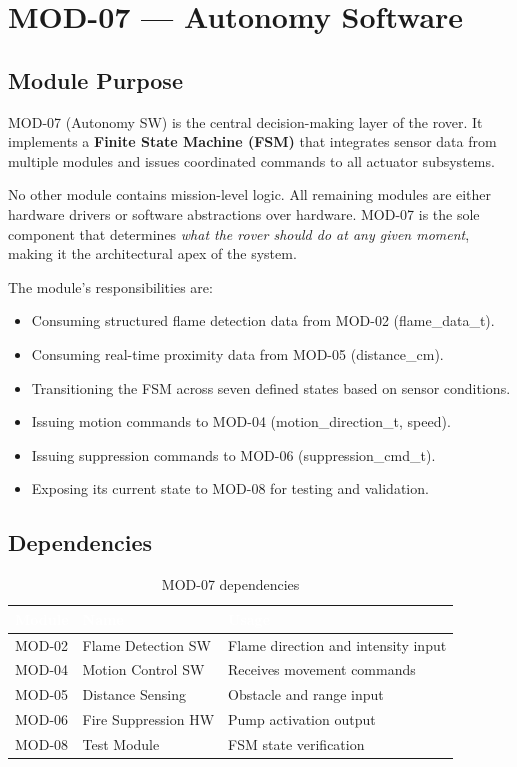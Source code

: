 \documentclass[12pt,a4paper]{article}
\newcommand{\theadtext}[1]{\textcolor{white}{\textbf{#1}}}
\newcommand{\fn}[1]{{\footnotesize\ttfamily #1}}
\begin{document}
\section{MOD-07 --- Autonomy Software}

\subsection{Module Purpose}

MOD-07 (Autonomy SW) is the central decision-making layer of the rover. It
implements a \textbf{Finite State Machine (FSM)} that integrates sensor data from
multiple modules and issues coordinated commands to all actuator subsystems.

No other module contains mission-level logic. All remaining modules are either
hardware drivers or software abstractions over hardware. MOD-07 is the sole
component that determines \emph{what the rover should do at any given moment},
making it the architectural apex of the system.

The module's responsibilities are:
\begin{itemize}[leftmargin=1.5em]
  \item Consuming structured flame detection data from MOD-02 (\fn{flame\_data\_t}).
  \item Consuming real-time proximity data from MOD-05 (\fn{distance\_cm}).
  \item Transitioning the FSM across seven defined states based on sensor conditions.
  \item Issuing motion commands to MOD-04 (\fn{motion\_direction\_t}, speed).
  \item Issuing suppression commands to MOD-06 (\fn{suppression\_cmd\_t}).
  \item Exposing its current state to MOD-08 for testing and validation.
\end{itemize}

\subsection{Dependencies}

\begin{table}[H]
\centering\small
\begin{tabularx}{\textwidth}{L{2cm} L{4cm} X}
\toprule
{}
\theadtext{Module} & \theadtext{Name} & \theadtext{Usage} \\
\midrule
{}   MOD-02 & Flame Detection SW & Flame direction and intensity input \\
 MOD-04 & Motion Control SW  & Receives movement commands \\
   MOD-05 & Distance Sensing   & Obstacle and range input \\
 MOD-06 & Fire Suppression HW & Pump activation output \\
   MOD-08 & Test Module        & FSM state verification \\
\bottomrule
\end{tabularx}
\caption{MOD-07 dependencies}
\end{table}
\end{document}
